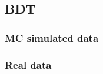 \subsection{BDT}
\label{sec:resultsBDT}

\subsubsection{MC simulated data}

\subsubsection{Real data}


